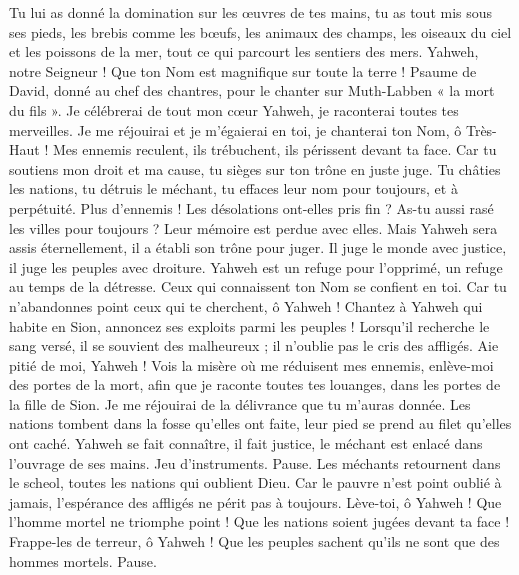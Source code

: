 \begin{multicols}{2}
Tu lui as donné la domination sur les œuvres de tes mains, tu as tout mis sous ses pieds,
les brebis comme les bœufs, les animaux des champs,
les oiseaux du ciel et les poissons de la mer, tout ce qui parcourt les sentiers des mers.
Yahweh, notre Seigneur ! Que ton Nom est magnifique sur toute la terre !
\VerseOne{}Psaume de David, donné au chef des chantres, pour le chanter sur Muth-Labben « la mort du fils ».
Je célébrerai de tout mon cœur Yahweh, je raconterai toutes tes merveilles.
Je me réjouirai et je m'égaierai en toi, je chanterai ton Nom, ô Très-Haut !
Mes ennemis reculent, ils trébuchent, ils périssent devant ta face.
Car tu soutiens mon droit et ma cause, tu sièges sur ton trône en juste juge.
Tu châties les nations, tu détruis le méchant, tu effaces leur nom pour toujours, et à perpétuité.
Plus d’ennemis ! Les désolations ont-elles pris fin ? As-tu aussi rasé les villes pour toujours ? Leur mémoire est perdue avec elles.
Mais Yahweh sera assis éternellement, il a établi son trône pour juger.
Il juge le monde avec justice, il juge les peuples avec droiture.
Yahweh est un refuge pour l’opprimé, un refuge au temps de la détresse.
Ceux qui connaissent ton Nom se confient en toi. Car tu n'abandonnes point ceux qui te cherchent, ô Yahweh !
Chantez à Yahweh qui habite en Sion, annoncez ses exploits parmi les peuples !
Lorsqu'il recherche le sang versé, il se souvient des malheureux ; il n’oublie pas le cris des affligés.
Aie pitié de moi, Yahweh ! Vois la misère où me réduisent mes ennemis, enlève-moi des portes de la mort,
afin que je raconte toutes tes louanges, dans les portes de la fille de Sion. Je me réjouirai de la délivrance que tu m'auras donnée.
Les nations tombent dans la fosse qu'elles ont faite, leur pied se prend au filet qu'elles ont caché.
Yahweh se fait connaître, il fait justice, le méchant est enlacé dans l'ouvrage de ses mains. Jeu d’instruments. Pause.
Les méchants retournent dans le scheol, toutes les nations qui oublient Dieu.
Car le pauvre n’est point oublié à jamais, l’espérance des affligés ne périt pas à toujours.
Lève-toi, ô Yahweh ! Que l'homme mortel ne triomphe point ! Que les nations soient jugées devant ta face !
Frappe-les de terreur, ô Yahweh ! Que les peuples sachent qu'ils ne sont que des hommes mortels. Pause.

\end{multicols}
